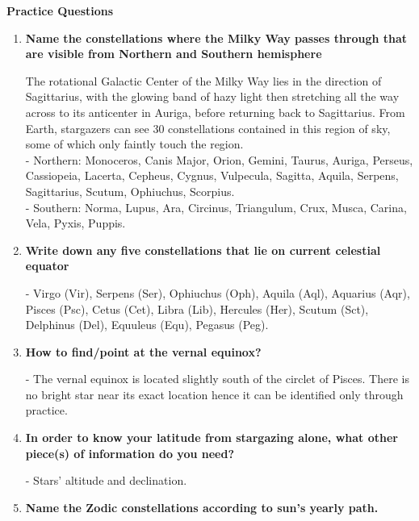\documentclass[a4paper,12pt]{extarticle}
\begin{document}
\textsf{\textbf{Practice Questions}}
\begin{enumerate}
	\item \textbf{Name the constellations where the Milky Way passes through that are visible from Northern and Southern hemisphere}
	\begin{sol}
	The rotational Galactic Center of the Milky Way lies in the direction of Sagittarius, with the glowing band of hazy light then stretching all the way across to its anticenter in Auriga, before returning back to Sagittarius. From Earth, stargazers can see 30 constellations contained in this region of sky, some of which only faintly touch the region.\\
	
	- \textsf{Northern}: Monoceros, Canis Major, Orion, Gemini, Taurus, Auriga, Perseus, Cassiopeia, Lacerta, Cepheus, Cygnus, Vulpecula, Sagitta, Aquila, Serpens, Sagittarius, Scutum, Ophiuchus, Scorpius.\\
	
	- \textsf{Southern}: Norma, Lupus, Ara, Circinus, Triangulum, Crux, Musca, Carina, Vela, Pyxis, Puppis.
	\end{sol}

	\item \textbf{Write down any five constellations that lie on current celestial equator}
	\begin{sol}
		- Virgo (Vir), Serpens (Ser), Ophiuchus (Oph), Aquila (Aql), Aquarius (Aqr), Pisces (Psc), Cetus (Cet), Libra (Lib), Hercules (Her), Scutum (Sct), Delphinus (Del), Equuleus (Equ), Pegasus (Peg).
	\end{sol}
	
	\item \textbf{How to find/point at the vernal equinox?}
	\begin{sol}
		- The vernal equinox is located slightly south of the circlet of Pisces. There is no bright star near its exact location hence it can be identified only through practice.
	\end{sol}
	
	\item \textbf{In order to know your latitude from stargazing alone, what other piece(s) of information do you need?}
	\begin{sol}
	- Stars' altitude and declination.
	\end{sol}

	
	\item \textbf{Name the Zodic constellations according to sun's yearly path.} 
	

\end{enumerate}
\end{document}
